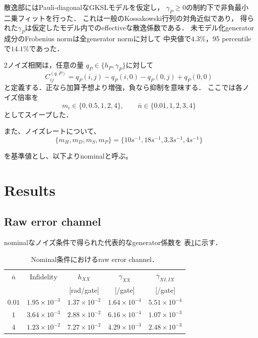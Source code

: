 \documentclass[dvipdfmx,a4paper,10pt,twocolumn]{jsarticle}
\begin{document}
散逸部にはPauli-diagonalなGKSLモデルを仮定し，
$\gamma_P\ge0$の制約下で非負最小二乗フィットを行った．
これは一般のKossakowski行列の対角近似であり，
得られた$\gamma_P$は仮定したモデル内でのeffectiveな散逸係数である．
未モデル化generator成分のFrobenius normは全generator normに対して
中央値で$4.3\%$，95 percentileで$14.1\%$であった．

2ノイズ相関は，任意の量
$q_P\in\{h_P,\gamma_P\}$に対して
\begin{equation}
 C_{ij}^{(q,P)}
 =
 q_P(i,j)-q_P(i,0)-q_P(0,j)+q_P(0,0)
 \label{eq:component_interaction}
\end{equation}
と定義する．正なら加算予想より増強，負なら抑制を意味する．
ここでは各ノイズ倍率を
\[
 m_i\in\{0,0.5,1,2,4\},
 \qquad
 \bar n\in\{0.01,1,2,3,4\}
\]
としてスイープした．

また、ノイズレートについて、
\[
  \{m_H, m_D, m_S, m_P\}= \{10s^{-1},18s^{-1},3.3s^{-1},4s^{-1}\}
\]

を基準値とし、以下よりnominalと呼ぶ。

\newpage

\section{Results}

\subsection{Raw error channel}

nominalなノイズ条件で得られた代表的なgenerator係数を
表\ref{tab:raw_generator}に示す．

\begin{table}[h]
\centering
\small
\setlength{\tabcolsep}{3.2pt}
\renewcommand{\arraystretch}{1.08}
\caption{Nominal条件におけるraw error channel．}
\label{tab:raw_generator}
\begin{tabular}{c|c|c|c|c}
\hline
$\bar n$
& $\mathrm{Infidelity}$
& $h_{XX}$
& $\gamma_{XX}$
& $\gamma_{XI,IX}$ \\
& & [rad/gate] & [/gate] & [/gate] \\
\hline
$0.01$
& $1.95\times10^{-3}$
& $1.37\times10^{-2}$
& $1.64\times10^{-4}$
& $5.51\times10^{-4}$ \\
$1$
& $3.64\times10^{-3}$
& $2.88\times10^{-2}$
& $6.16\times10^{-4}$
& $1.07\times10^{-3}$ \\
$4$
& $1.23\times10^{-2}$
& $7.27\times10^{-2}$
& $4.29\times10^{-3}$
& $2.48\times10^{-3}$ \\
\hline
\end{tabular}
\end{table}
\end{document}
